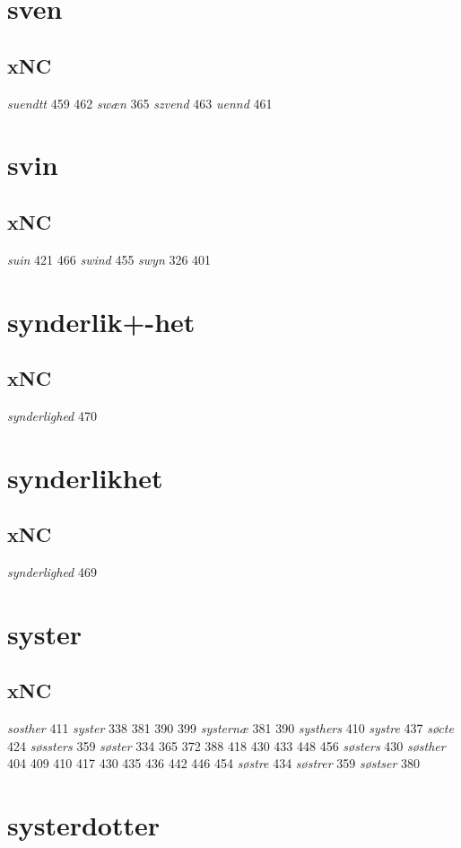\documentclass[a4paper,twocolumn]{article}
\begin{document}
\section{sven}
\label{sec:org87312b1}
\subsection{xNC}
\label{sec:orgf2f51a2}
\emph{suendtt} 459 462 \emph{swæn} 365 \emph{szvend} 463 \emph{uennd} 461 
\section{svin}
\label{sec:orgd3bbb28}
\subsection{xNC}
\label{sec:org4171221}
\emph{suin} 421 466 \emph{swind} 455 \emph{swyn} 326 401 
\section{synderlik+-het}
\label{sec:orgaac2fb9}
\subsection{xNC}
\label{sec:org0b3069e}
\emph{synderlighed} 470 
\section{synderlikhet}
\label{sec:org7796d45}
\subsection{xNC}
\label{sec:org5889909}
\emph{synderlighed} 469 
\section{syster}
\label{sec:org3c3bd43}
\subsection{xNC}
\label{sec:org704a3b5}
\emph{sosther} 411 \emph{syster} 338 381 390 399 \emph{systernæ} 381 390 \emph{systhers} 410 \emph{systre} 437 \emph{søcte} 424 \emph{søssters} 359 \emph{søster} 334 365 372 388 418 430 433 448 456 \emph{søsters} 430 \emph{søsther} 404 409 410 417 430 435 436 442 446 454 \emph{søstre} 434 \emph{søstrer} 359 \emph{søstser} 380 
\section{systerdotter}
\label{sec:orgaa08ad8}
\end{document}
